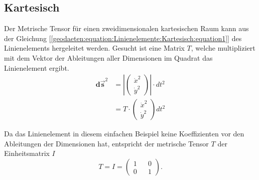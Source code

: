%
%
%
%
\subsection{Kartesisch\label{geodaeten:section:MetKartesisch}}

Der Metrische Tensor für einen zweidimensionalen kartesischen Raum kann aus der Gleichung [\ref{geodaeten:equation:Linienelemente:Kartesisch:equation1}] des Linienelements hergeleitet werden.
Gesucht ist eine Matrix $T$, welche multipliziert mit dem Vektor der Ableitungen aller Dimensionen im Quadrat das Linienelement ergibt. 
\begin{equation}
	\begin{aligned} 
	\mathbf{d\vec{s}}^2 &= \left| \begin{pmatrix} \dot{x}^2 \\ \dot{y}^2 \end{pmatrix} \right| \cdot dt^2 \\
	&= T \cdot \begin{pmatrix} \dot{x}^2 \\ \dot{y}^2 \end{pmatrix} dt^2
	\end{aligned}	
\end{equation}

Da das Linienelement in diesem einfachen Beispiel keine Koeffizienten vor den Ableitungen der Dimensionen hat, entspricht der metrische Tensor $T$ der Einheitsmatrix $I$
\begin{equation}
		T = I = \begin{pmatrix} 1 && 0 \\ 0 && 1 \end{pmatrix} .
\end{equation}

